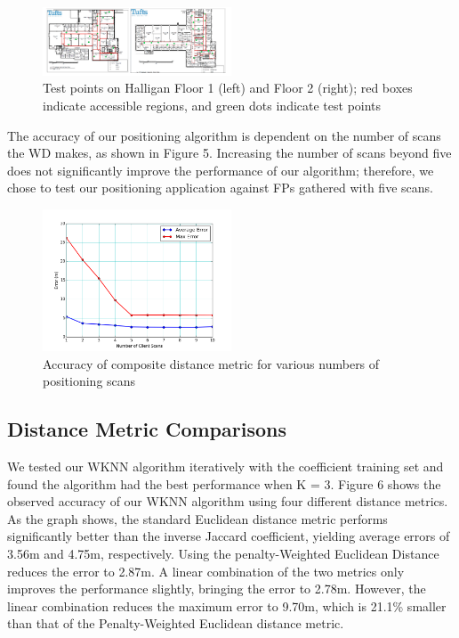 \documentclass[conference]{IEEEtran}
\begin{document}
\begin{figure}[h!]
  \centering
    \includegraphics[width=0.5\textwidth]{testpoints}
   \caption{Test points on Halligan Floor 1 (left) and Floor 2 (right); red boxes indicate accessible regions, and green dots indicate test points}
\end{figure}

The accuracy of our positioning algorithm is dependent on the number of scans the WD makes, as shown in Figure 5. Increasing the number of scans beyond five does not significantly improve the performance of our algorithm; therefore, we chose to test our positioning application against FPs gathered with five scans.

\begin{figure}[h!]
  \centering
    \includegraphics[width=0.5\textwidth]{pull_errors.png}
   \caption{Accuracy of composite distance metric for various numbers of positioning scans}
\end{figure}

\subsection{Distance Metric Comparisons}
We tested our WKNN algorithm iteratively with the coefficient training set and found the algorithm had the best performance when K = 3. Figure 6 shows the observed accuracy of our WKNN algorithm using four different distance metrics. As the graph shows, the standard Euclidean distance metric performs significantly better than the inverse Jaccard coefficient, yielding average errors of 3.56m and 4.75m, respectively. Using the penalty-Weighted Euclidean Distance reduces the error to 2.87m. A linear combination of the two metrics only improves the performance slightly, bringing the error to 2.78m. However, the linear combination reduces the maximum error to 9.70m, which is 21.1\% smaller than that of the Penalty-Weighted Euclidean distance metric.
\end{document}
